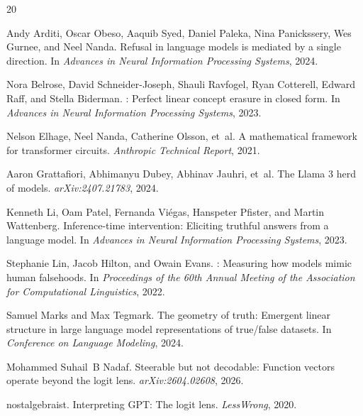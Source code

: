 \begin{thebibliography}{20}

Andy Arditi, Oscar Obeso, Aaquib Syed, Daniel Paleka, Nina Panickssery, Wes Gurnee, and Neel Nanda.
\newblock Refusal in language models is mediated by a single direction.
\newblock In \emph{Advances in Neural Information Processing Systems}, 2024.

Nora Belrose, David Schneider-Joseph, Shauli Ravfogel, Ryan Cotterell, Edward Raff, and Stella Biderman.
: Perfect linear concept erasure in closed form.
\newblock In \emph{Advances in Neural Information Processing Systems}, 2023.

Nelson Elhage, Neel Nanda, Catherine Olsson, et~al.
\newblock A mathematical framework for transformer circuits.
\newblock \emph{Anthropic Technical Report}, 2021.

Aaron Grattafiori, Abhimanyu Dubey, Abhinav Jauhri, et~al.
\newblock The {Llama} 3 herd of models.
\newblock \emph{arXiv:2407.21783}, 2024.

Kenneth Li, Oam Patel, Fernanda Vi\'egas, Hanspeter Pfister, and Martin Wattenberg.
\newblock Inference-time intervention: Eliciting truthful answers from a language model.
\newblock In \emph{Advances in Neural Information Processing Systems}, 2023.

Stephanie Lin, Jacob Hilton, and Owain Evans.
: Measuring how models mimic human falsehoods.
\newblock In \emph{Proceedings of the 60th Annual Meeting of the Association for Computational Linguistics}, 2022.

Samuel Marks and Max Tegmark.
\newblock The geometry of truth: Emergent linear structure in large language model representations of true/false datasets.
\newblock In \emph{Conference on Language Modeling}, 2024.

Mohammed Suhail~B Nadaf.
\newblock Steerable but not decodable: Function vectors operate beyond the logit lens.
\newblock \emph{arXiv:2604.02608}, 2026.

nostalgebraist.
\newblock Interpreting {GPT}: The logit lens.
\newblock \emph{LessWrong}, 2020.


\end{thebibliography}
